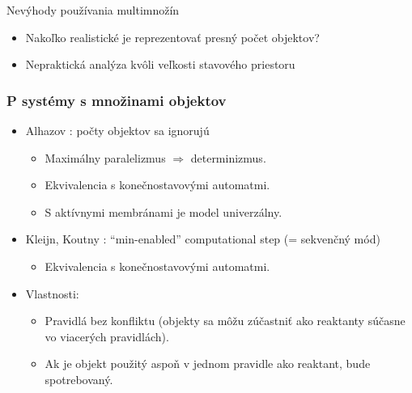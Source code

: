 \begin{frame}[t]{Nevýhody používania multimnožín}
  \begin{itemize}
    \item Nakoľko realistické je reprezentovať presný počet objektov?
    \item Nepraktická analýza kvôli veľkosti stavového priestoru
  \end{itemize}
\end{frame}

\begin{frame}[t]\frametitle{P systémy s množinami objektov}
  \begin{itemize}
    \item Alhazov \cite{Alhazov05WithoutMultiplicities}: počty objektov sa ignorujú
    \pause
    \begin{itemize}
      \item Maximálny paralelizmus $\Rightarrow$ determinizmus.
      \pause
      \item Ekvivalencia s konečnostavovými automatmi.
      \pause
      \item S aktívnymi membránami je model univerzálny.
    \end{itemize}
    \item Kleijn, Koutny \cite{Kleijn11SetMembrane}: ``min-enabled'' computational step (= sekvenčný mód)
    \pause
    \begin{itemize}
      \item Ekvivalencia s konečnostavovými automatmi.
    \end{itemize}
    \pause
    \item Vlastnosti:
    \begin{itemize}
      \item Pravidlá bez konfliktu (objekty sa môžu zúčastniť ako reaktanty súčasne vo viacerých pravidlách).
      \item Ak je objekt použitý aspoň v jednom pravidle ako reaktant, bude spotrebovaný.
    \end{itemize}
  \end{itemize}
\end{frame}
\note{}

